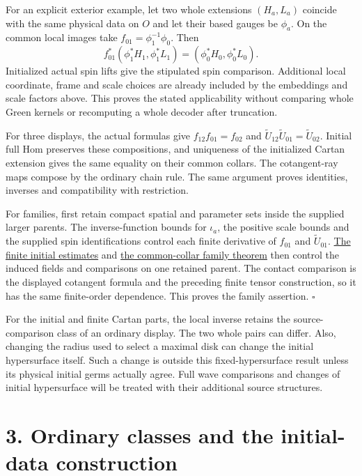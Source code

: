 \documentclass[
  english,
  11pt,
  reqno]{amsart}
\begin{document}
For an explicit exterior example, let two whole extensions \((H_a,L_a)\)
coincide with the same physical data on \(O\) and let their based gauges
be \(\phi_a\). On the common local images take
\(f_{01}=\phi_1^{-1}\phi_0\). Then%
 \[
f_{01}^*(\phi_1^*H_1,\phi_1^*L_1)
=(\phi_0^*H_0,\phi_0^*L_0).
\] Initialized actual spin lifts give the stipulated spin comparison.
Additional local coordinate, frame and scale choices are already
included by the embeddings and scale factors above. This proves the
stated applicability without comparing whole Green kernels or
recomputing a whole decoder after truncation.

For three displays, the actual formulas give \(f_{12}f_{01}=f_{02}\) and
\(\widetilde U_{12}\widetilde U_{01}=\widetilde U_{02}\). Initial full
Hom preserves these compositions, and uniqueness of the initialized
Cartan extension gives the same equality on their common collars. The
cotangent-ray maps compose by the ordinary chain rule. The same argument
proves identities, inverses and compatibility with restriction.

For families, first retain compact spatial and parameter sets inside the
supplied larger parents. The inverse-function bounds for \(\iota_a\),
the positive scale bounds and the supplied spin identifications control
each finite derivative of \(f_{01}\) and \(\widetilde U_{01}\).
\hyperref[prop:online-initial-gradient-descent-families]{The finite
initial estimates} and
\hyperref[thm:online-common-collar-finite-families]{the common-collar
family theorem} then control the induced fields and comparisons on one
retained parent. The contact comparison is the displayed cotangent
formula and the preceding finite tensor construction, so it has the same
finite-order dependence. This proves the family assertion.
\hfill\(\square\)

For the initial and finite Cartan parts, the local inverse retains the
source-comparison class of an ordinary display. The two whole pairs can
differ. Also, changing the radius used to select a maximal disk can
change the initial hypersurface itself. Such a change is outside this
fixed-hypersurface result unless its physical initial germs actually
agree. Full wave comparisons and changes of initial hypersurface will be
treated with their additional source structures.

\section{3. Ordinary classes and the initial-data
construction}\label{ordinary-classes-and-the-initial-data-construction}\label{sec:online-ordinary-input-construction}
\end{document}
